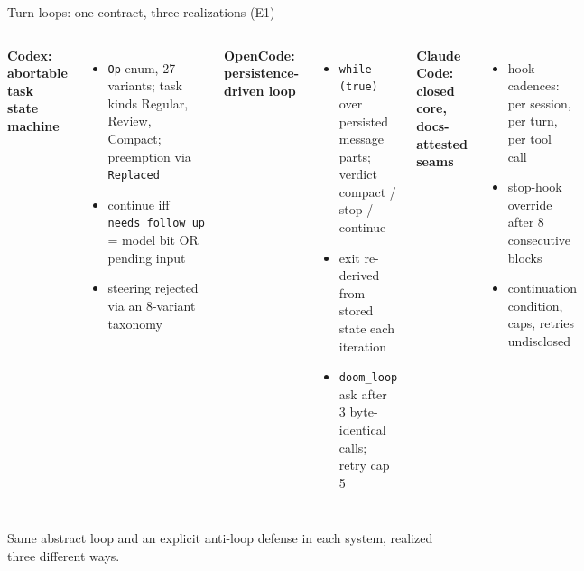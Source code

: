 \documentclass[aspectratio=169,11pt]{beamer}
\newcommand{\codex}[0]{Codex}
\newcommand{\occ}[0]{OpenCode}
\newcommand{\ccc}[0]{Claude Code}
\begin{document}
\begin{frame}{Turn loops: one contract, three realizations (E1)}
  \small
  \begin{columns}[T]
      \textbf{\codex{}: abortable task state machine}
      \begin{itemize}
        \item \texttt{Op} enum, 27 variants; task kinds Regular, Review,
          Compact; preemption via \texttt{Replaced}~\citep{codexRepo}
        \item continue iff \texttt{needs\_follow\_up} = model bit OR
          pending input
        \item steering rejected via an 8-variant taxonomy
      \end{itemize}
      \textbf{\occ{}: persistence-driven loop}
      \begin{itemize}
        \item \texttt{while (true)} over persisted message parts; verdict
          compact / stop / continue~\citep{opencodeRepo}
        \item exit re-derived from stored state each iteration
        \item \texttt{doom\_loop} ask after 3 byte-identical calls;
          retry cap 5
      \end{itemize}
      \textbf{\ccc{}: closed core, docs-attested seams}
      \begin{itemize}
        \item hook cadences: per session, per turn, per tool
          call~\citep{claudeCodeDocsHooks}
        \item stop-hook override after 8 consecutive blocks
        \item continuation condition, caps, retries undisclosed
      \end{itemize}
  \end{columns}

  \medskip
  Same abstract loop and an explicit anti-loop defense in each system,
  realized three different ways.
\end{frame}
\end{document}
